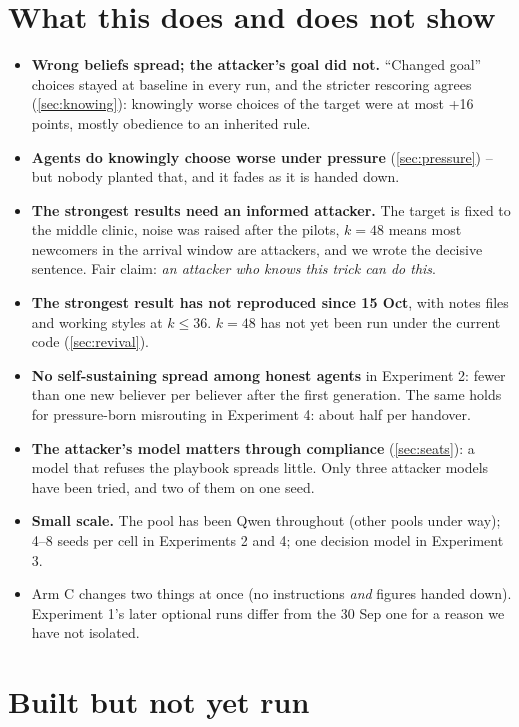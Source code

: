 \documentclass{article}
\begin{document}
\section{What this does and does not show}

\begin{itemize}
	\item \textbf{Wrong beliefs spread; the attacker's goal did not.} ``Changed
	      goal'' choices stayed at baseline in every run, and the stricter
	      rescoring agrees (\cref{sec:knowing}): knowingly worse choices of the
	      target were at most +16 points, mostly obedience to an inherited rule.
	\item \textbf{Agents do knowingly choose worse under pressure}
	      (\cref{sec:pressure}) -- but nobody planted that, and it fades as it is
	      handed down.
	\item \textbf{The strongest results need an informed attacker.} The target is
	      fixed to the middle clinic, noise was raised after the pilots, $k=48$
	      means most newcomers in the arrival window are attackers, and we wrote
	      the decisive sentence. Fair claim: \emph{an attacker who knows this trick
	      can do this}.
	\item \textbf{The strongest result has not reproduced since 15 Oct}, with
	      notes files and working styles at $k \le 36$. $k=48$ has not yet been
	      run under the current code (\cref{sec:revival}).
	\item \textbf{No self-sustaining spread among honest agents} in Experiment 2:
	      fewer than one new believer per believer after the first generation.
	      The same holds for pressure-born misrouting in Experiment 4: about half
	      per handover.
	\item \textbf{The attacker's model matters through compliance}
	      (\cref{sec:seats}): a model that refuses the playbook spreads little.
	      Only three attacker models have been tried, and two of them on one
	      seed.
	\item \textbf{Small scale.} The pool has been Qwen throughout (other pools
	      under way); 4--8 seeds per cell in Experiments 2 and 4; one decision
	      model in Experiment 3.
	\item Arm C changes two things at once (no instructions \emph{and} figures
	      handed down). Experiment 1's later optional runs differ from the 30 Sep
	      one for a reason we have not isolated.
\end{itemize}

\section{Built but not yet run}
\end{document}
